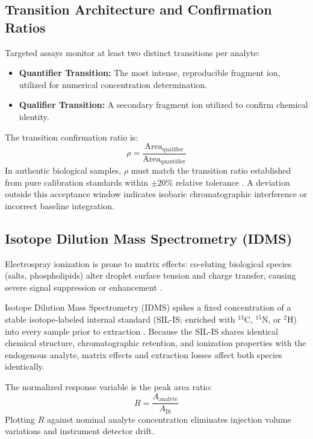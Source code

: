 \documentclass[11pt,twoside,openright]{book}
\begin{document}
\subsection{Transition Architecture and Confirmation Ratios}
Targeted assays monitor at least two distinct transitions per analyte:
\begin{itemize}
    \item \textbf{Quantifier Transition:} The most intense, reproducible fragment ion, utilized for numerical concentration determination.
    \item \textbf{Qualifier Transition:} A secondary fragment ion utilized to confirm chemical identity.
\end{itemize}
The transition confirmation ratio is:
\begin{equation}
\rho = \frac{\text{Area}_{\text{qualifier}}}{\text{Area}_{\text{quantifier}}}
\label{eq:transition_ratio}
\end{equation}
In authentic biological samples, $\rho$ must match the transition ratio established from pure calibration standards within $\pm 20\%$ relative tolerance \cite{carr2014targeted, maclean2010skyline}. A deviation outside this acceptance window indicates isobaric chromatographic interference or incorrect baseline integration.

\subsection{Isotope Dilution Mass Spectrometry (IDMS)}
Electrospray ionization is prone to matrix effects: co-eluting biological species (salts, phospholipids) alter droplet surface tension and charge transfer, causing severe signal suppression or enhancement \cite{matuszewski2003strategies}.

Isotope Dilution Mass Spectrometry (IDMS) spikes a fixed concentration of a stable isotope-labeled internal standard (SIL-IS; enriched with $^{13}\text{C}$, $^{15}\text{N}$, or $^{2}\text{H}$) into every sample prior to extraction \cite{matuszewski2003strategies, ong2002stable, carr2014targeted}. Because the SIL-IS shares identical chemical structure, chromatographic retention, and ionization properties with the endogenous analyte, matrix effects and extraction losses affect both species identically.

The normalized response variable is the peak area ratio:
\begin{equation}
R = \frac{A_{\text{analyte}}}{A_{\text{IS}}}
\label{eq:area_ratio}
\end{equation}
Plotting $R$ against nominal analyte concentration eliminates injection volume variations and instrument detector drift.
\end{document}
